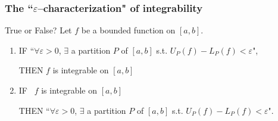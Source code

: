 \documentclass[14pt]{beamer}
\newcommand{\e}{\varepsilon}
\newcommand{\setsize}[1]{\fontsize{#1}{#1}\selectfont} %
\newcommand{\lifab}{\underline{I_a^b}(f)}
\newcommand{\uifab}{\overline{I_a^b}(f)}
\newcommand{\puntos}[2]{ \draw[thick] (-5,0) to (5,0);

\draw[decorate, decoration={brace, amplitude=10pt}, yshift=10pt] (#1-3.5,-0) -- (#1-0,-0)
node [red,midway,yshift=20pt]{lower sums};

\draw[red, fill] (#1-2.5,0) circle [radius=0.1] ; \draw[red, fill] (#1-3.3,0)
circle [radius=0.1] ; \draw[red, fill] (#1-2.0,0) circle [radius=0.1] ; \draw[red,
fill] (#1-1.8,0) circle [radius=0.1] ; \draw[red, fill] (#1-1.3,0) circle [radius=0.1]
; \draw[red, fill] (#1-0.8,0) circle [radius=0.1] ; \draw[red, fill] (#1-0.5,0) circle
[radius=0.1] ; \draw[red, fill] (#1-0.2,0) circle [radius=0.1] ; \draw[red, fill]
(#1-0.05,0) circle [radius=0.1] ;

\draw[decorate, decoration={brace, amplitude=10pt}, yshift=10pt] (#2+0,0) -- (#2+3.5,0)
node [verde,midway,yshift=20pt]{upper sums};

\draw[verde, fill] (#2+2.7,0) circle [radius=0.1] ; \draw[verde, fill] (#2+3.1,0)
circle [radius=0.1] ; \draw[verde, fill] (#2+1.8,0) circle [radius=0.1] ; \draw[verde,
fill] (#2+1.5,0) circle [radius=0.1] ; \draw[verde, fill] (#2+1.2,0) circle [radius=0.1]
; \draw[verde, fill] (#2+0.7,0) circle [radius=0.1] ; \draw[verde, fill] (#2+0.4,0)
circle [radius=0.1] ; \draw[verde, fill] (#2+0.2,0) circle [radius=0.1] ; \draw[verde,
fill] (#2+0.03,0) circle [radius=0.1] ; }
\newcommand{\puntosmas}[2]{ \puntos{#1}{#2} \draw[very thick, ->] (#1-3.5,-1)--(#1-0,-1)
node[black,midway,yshift=-20pt]{finer partitions}; \draw[very thick, ->] (#2+3.5,-1)--(#2+0,-1)
node[black,midway,yshift=-20pt]{finer partitions}; }
\begin{document}
	\begin{frame}[t]
		\setsize{11}
		\frametitle{The ``$\e$--characterization" of integrability}

		\begin{block}{\setsize{11} True or False?}
			Let $f$ be a bounded function on $[a,b]$.
			\begin{enumerate}
				\item IF \hfill ``$\forall \varepsilon>0$, $\exists$ a partition $P$ of
					$[a,b]$ s.t. ${\displaystyle U_P(f) - L_P(f) < \varepsilon}$",
					\vspace{.1cm}

					THEN \; $f$ is integrable on $[a,b]$
					\vspace{.1cm}

				\item IF \quad \quad \, $f$ is integrable on $[a,b]$
					\vspace{.1cm}
					\\
					\vspace{.1cm}

					THEN \hfill ``$\forall \varepsilon>0$, $\exists$ a partition $P$ of $[a
					,b]$ s.t. ${\displaystyle U_P(f) - L_P(f) < \varepsilon}$".
					\vspace{.1cm}
			\end{enumerate}
		\end{block}

		\vfill

		\begin{center}
		\end{center}
	\end{frame}
\end{document}
